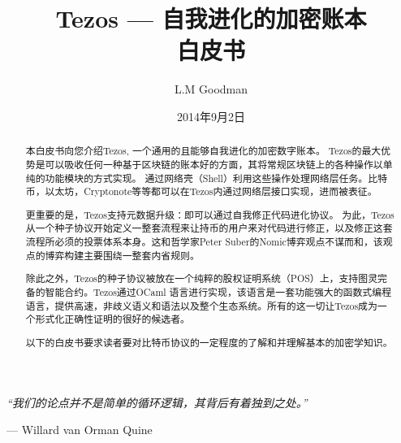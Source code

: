 \documentclass[letterpaper]{article}
\author{L.M Goodman}
\date{2014年9月2日}
\title{Tezos --- 自我进化的加密账本 \\ 白皮书}
\begin{document}
\maketitle

\epigraph{\emph{``我们的论点并不是简单的循环逻辑，其背后有着独到之处。''}}
{--- \textup{Willard van Orman Quine}}


\begin{abstract}
本白皮书向您介绍Tezos, 一个通用的且能够自我进化的加密数字账本。
Tezos的最大优势是可以吸收任何一种基于区块链的账本好的方面，其将常规区块链上的各种操作以单纯的功能模块的方式实现。
通过网络壳（Shell）利用这些操作处理网络层任务。比特币，以太坊，Cryptonote等等都可以在Tezos内通过网络层接口实现，进而被表征。


更重要的是，Tezos支持元数据升级：即可以通过自我修正代码进化协议。
为此，Tezos从一个种子协议开始定义一整套流程来让持币的用户来对代码进行修正，以及修正这套流程所必须的投票体系本身。这和哲学家Peter Suber的Nomic\cite{Nomic}博弈观点不谋而和，该观点的博弈构建主要围绕一整套内省规则。

除此之外，Tezos的种子协议被放在一个纯粹的股权证明系统（POS）上，支持图灵完备的智能合约。Tezos通过OCaml 语言进行实现，该语言是一套功能强大的函数式编程语言，提供高速，非歧义语义和语法以及整个生态系统。所有的这一切让Tezos成为一个形式化正确性证明的很好的候选者。

以下的白皮书要求读者要对比特币协议的一定程度的了解和并理解基本的加密学知识。

\end{abstract}
\newpage
\end{document}
